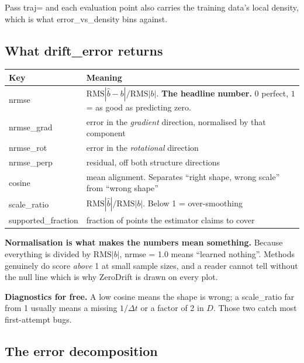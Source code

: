 \documentclass[11pt,a4paper]{article}
\newcommand{\code}[1]{{\ttfamily\small #1}}
\begin{document}
Pass \code{traj=} and each evaluation point also carries the training data's local
density, which is what \code{error\_vs\_density} bins against.

\subsection{What \code{drift\_error} returns}

\begin{center}
\begin{tabular}{@{}L{0.21\textwidth} L{0.73\textwidth}@{}}
\toprule
\textbf{Key} & \textbf{Meaning} \\
\midrule
\code{nrmse}      & $\mathrm{RMS}|\hat b - b| / \mathrm{RMS}|b|$. \textbf{The headline number.} $0$ perfect, $1$ = as good as predicting zero. \\
\code{nrmse\_grad}& error in the \emph{gradient} direction, normalised by that component \\
\code{nrmse\_rot} & error in the \emph{rotational} direction \\
\code{nrmse\_perp}& residual, off both structure directions \\
\code{cosine}     & mean alignment. Separates ``right shape, wrong scale'' from ``wrong shape'' \\
\code{scale\_ratio}& $\mathrm{RMS}|\hat b|/\mathrm{RMS}|b|$. Below 1 = over-smoothing \\
\code{supported\_fraction} & fraction of points the estimator claims to cover \\
\bottomrule
\end{tabular}
\end{center}

\begin{keybox}
\textbf{Normalisation is what makes the numbers mean something.} Because everything is
divided by $\mathrm{RMS}|b|$, \code{nrmse = 1.0} means ``learned nothing''. Methods
genuinely do score \emph{above} 1 at small sample sizes, and a reader cannot tell
without the null line \textemdash{} which is why \code{ZeroDrift} is drawn on every plot.

\textbf{Diagnostics for free.} A low \code{cosine} means the shape is wrong; a
\code{scale\_ratio} far from 1 usually means a missing $1/\Delta t$ or a factor of 2 in
$D$. Those two catch most first-attempt bugs.
\end{keybox}

\subsection{The error decomposition}
\end{document}
